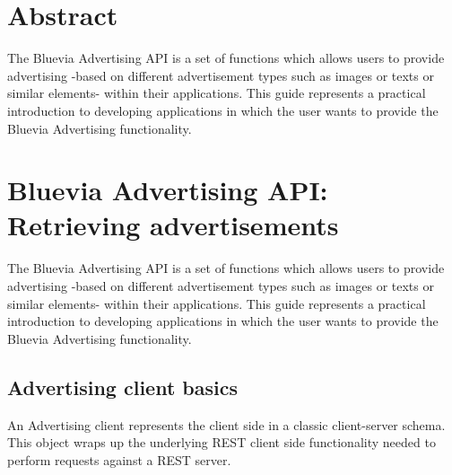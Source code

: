\hypertarget{blv_ad_guide_ad_abstract_sec}{}\section{Abstract}\label{blv_ad_guide_ad_abstract_sec}
The Bluevia Advertising API is a set of functions which allows users to provide advertising -\/based on different advertisement types such as images or texts or similar elements-\/ within their applications. This guide represents a practical introduction to developing applications in which the user wants to provide the Bluevia Advertising functionality.\hypertarget{blv_ad_guide_blv_ad_api_retrievings_ads_sec}{}\section{Bluevia Advertising API: Retrieving advertisements}\label{blv_ad_guide_blv_ad_api_retrievings_ads_sec}
The Bluevia Advertising API is a set of functions which allows users to provide advertising -\/based on different advertisement types such as images or texts or similar elements-\/ within their applications. This guide represents a practical introduction to developing applications in which the user wants to provide the Bluevia Advertising functionality.\hypertarget{blv_ad_guide_ad_client_basics_sec}{}\subsection{Advertising client basics}\label{blv_ad_guide_ad_client_basics_sec}
An Advertising client represents the client side in a classic client-\/server schema. This object wraps up the underlying REST client side functionality needed to perform requests against a REST server.

